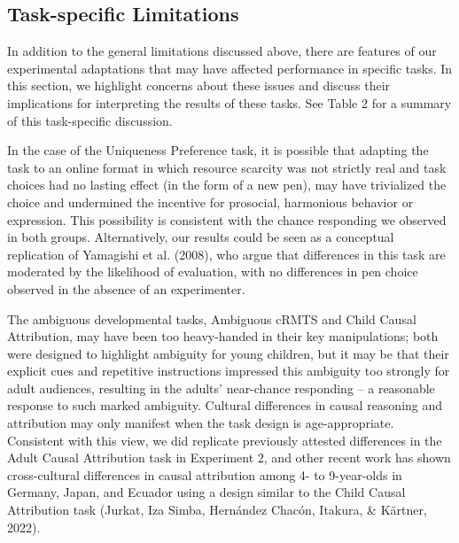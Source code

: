 \documentclass[
  man,floatsintext]{apa6}
\begin{document}
\hypertarget{task-specific-limitations}{%
\subsection{Task-specific Limitations}\label{task-specific-limitations}}

In addition to the general limitations discussed above, there are features of our experimental adaptations that may have affected performance in specific tasks. In this section, we highlight concerns about these issues and discuss their implications for interpreting the results of these tasks. See Table 2 for a summary of this task-specific discussion.

In the case of the Uniqueness Preference task, it is possible that adapting the task to an online format in which resource scarcity was not strictly real and task choices had no lasting effect (in the form of a new pen), may have trivialized the choice and undermined the incentive for prosocial, harmonious behavior or expression. This possibility is consistent with the chance responding we observed in both groups. Alternatively, our results could be seen as a conceptual replication of Yamagishi et al. (2008), who argue that differences in this task are moderated by the likelihood of evaluation, with no differences in pen choice observed in the absence of an experimenter.

The ambiguous developmental tasks, Ambiguous cRMTS and Child Causal Attribution, may have been too heavy-handed in their key manipulations; both were designed to highlight ambiguity for young children, but it may be that their explicit cues and repetitive instructions impressed this ambiguity too strongly for adult audiences, resulting in the adults' near-chance responding -- a reasonable response to such marked ambiguity. Cultural differences in causal reasoning and attribution may only manifest when the task design is age-appropriate. Consistent with this view, we did replicate previously attested differences in the Adult Causal Attribution task in Experiment 2, and other recent work has shown cross-cultural differences in causal attribution among 4- to 9-year-olds in Germany, Japan, and Ecuador using a design similar to the Child Causal Attribution task (Jurkat, Iza Simba, Hernández Chacón, Itakura, \& Kärtner, 2022).
\end{document}
